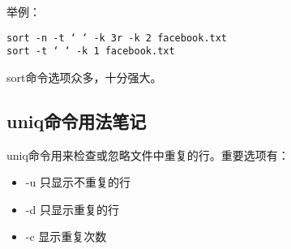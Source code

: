 举例：
\begin{verbatim}
sort -n -t ‘ ‘ -k 3r -k 2 facebook.txt
sort -t ‘ ‘ -k 1 facebook.txt
\end{verbatim}

sort命令选项众多，十分强大。
\subsection{uniq命令用法笔记}

uniq命令用来检查或忽略文件中重复的行。重要选项有：

\begin{itemize}
    \item -u 只显示不重复的行
    \item -d 只显示重复的行
    \item -c 显示重复次数
\end{itemize}



